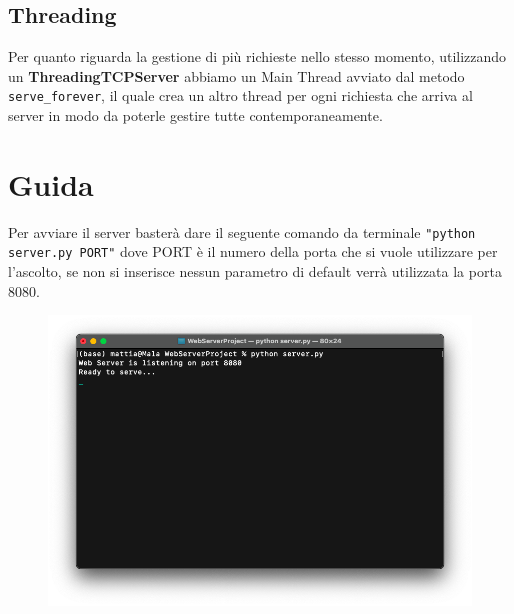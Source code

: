 \documentclass[a4paper,12pt]{report}
\begin{document}
\section{Threading}

Per quanto riguarda la gestione di più richieste nello stesso momento, utilizzando un \textbf{ThreadingTCPServer} abbiamo un Main Thread avviato dal metodo \texttt{serve\_forever}, il quale crea un altro thread per ogni richiesta che arriva al server in modo da poterle gestire tutte contemporaneamente.


\chapter{Guida}
Per avviare il server basterà dare il seguente comando da terminale \texttt{"python server.py PORT"} dove PORT è il numero della porta che si vuole utilizzare per l’ascolto, se non si inserisce nessun parametro di default verrà utilizzata la porta 8080.


\begin{figure}[ht]
    \begin{center}
        \centering
        \includegraphics[width=\textwidth]{img/Terminale1.png}
    \end{center}
\end{figure}

\clearpage
\end{document}
